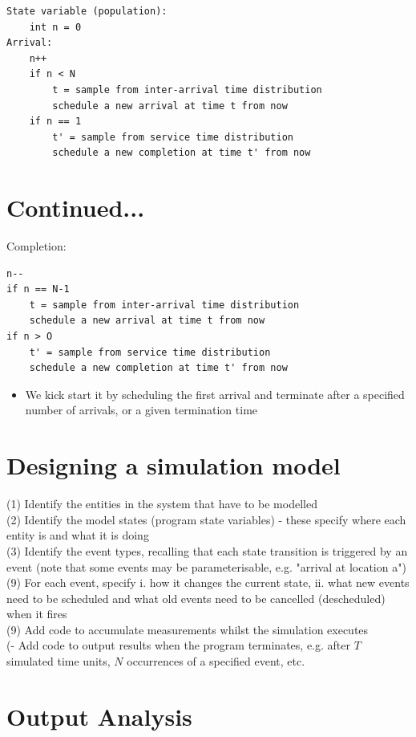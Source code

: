 \documentclass[10pt]{article}
\begin{document}
\begin{verbatim}
State variable (population):
    int n = 0
Arrival:
    n++
    if n < N
        t = sample from inter-arrival time distribution
        schedule a new arrival at time t from now
    if n == 1
        t' = sample from service time distribution
        schedule a new completion at time t' from now
\end{verbatim}

\section*{Continued...}
Completion:

\begin{verbatim}
n--
if n == N-1
    t = sample from inter-arrival time distribution
    schedule a new arrival at time t from now
if n > O
    t' = sample from service time distribution
    schedule a new completion at time t' from now
\end{verbatim}

\begin{itemize}
  \item We kick start it by scheduling the first arrival and terminate after a specified number of arrivals, or a given termination time
\end{itemize}

\section*{Designing a simulation model}
(1) Identify the entities in the system that have to be modelled\\
(2) Identify the model states (program state variables) - these specify where each entity is and what it is doing\\
(3) Identify the event types, recalling that each state transition is triggered by an event (note that some events may be parameterisable, e.g. "arrival at location a")\\
(9) For each event, specify i. how it changes the current state, ii. what new events need to be scheduled and what old events need to be cancelled (descheduled) when it fires\\
(9) Add code to accumulate measurements whilst the simulation executes\\
(- Add code to output results when the program terminates, e.g. after $T$ simulated time units, $N$ occurrences of a specified event, etc.

\section*{Output Analysis}
\end{document}
